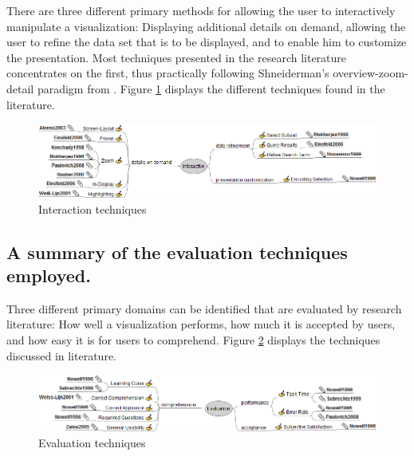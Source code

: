 There are three different primary methods for allowing the user to interactively manipulate a visualization: Displaying additional details on demand, allowing the user to refine the data set that is to be displayed, and to enable him to customize the presentation. Most techniques presented in the research literature concentrates on the first, thus practically following Shneiderman's overview-zoom-detail paradigm from \cite{Shneiderman1996}. Figure \ref{img:techniques:interaction} displays the different techniques found in the literature.
\begin{figure}[htbp]
  \begin{center}
    \includegraphics[width=6in]{exercises/img_technique_interaction.png}
    \caption{Interaction techniques}
    \label{img:techniques:interaction}
  \end{center}
\end{figure}

\subsection{A summary of the evaluation techniques employed.}
Three different primary domains can be identified that are evaluated by research literature: How well a visualization performs, how much it is accepted by users, and how easy it is for users to comprehend. Figure \ref{img:techniques:evaluation} displays the techniques discussed in literature.
\begin{figure}[htbp]
  \begin{center}
    \includegraphics[width=6in]{exercises/img_technique_evaluation.png}
    \caption{Evaluation techniques}
    \label{img:techniques:evaluation}
  \end{center}
\end{figure}